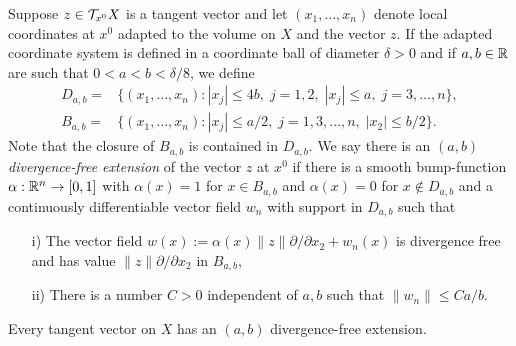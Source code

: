 Suppose $z\in {\cal T}_{x^0}X$ is a tangent vector
and let
$(x_1,\ldots, x_n)$ denote local coordinates at $x^0$ adapted to
the volume on $X$ and the vector $z$.
If the adapted coordinate system is defined in a coordinate ball of
diameter $\delta>0$ and if
$a,b\in {\Bbb{R}}$ are such that
$0<a<b<\delta/8$, we define
\begin{eqnarray*}
D_{a,b}= &\{(x_1,\ldots, x_n): |x_j | \le 4b, \;
j=1,2, \;  |x_j |\le a,\; j=3,\ldots,n\},     \\
B_{a,b}= &\{(x_1,\ldots, x_n): |x_j | \le a/2, \;
j=1,3,\ldots,n, \;  |x_2 |\le b/2\}.
\end{eqnarray*}
Note that the closure of $B_{a,b}$ is contained in $D_{a,b}$.
We say there is an {\em $(a,b)$ divergence-free extension}
of the vector $z$ at $x^0$
if there is a smooth bump-function $\alpha:{\Bbb{R}}^n\to[0,1]$ with
$ \alpha(x) =1$
for $x \in B_{a,b}$ and
$\alpha(x) =0$ for $x\notin D_{a,b}$
and a continuously differentiable
vector field $w_n$ with support in $D_{a,b}$
such that
\begin{itemize}
\item[i)] The vector field
$w(x):=\alpha(x)\|z\|{\partial}/{\partial x_2}+w_n(x)$
is divergence free and has value $\|z\|{\partial}/{\partial x_2}$
in $B_{a,b}$,
\item[ii)] There is a number $C>0$ independent of $a,b$ such
that $\|w_n\|\le C a/b$.
\end{itemize}

\begin{lem}
\label{loc}
Every tangent vector on $X$ has an
$(a,b)$ divergence-free extension.
\end{lem}

